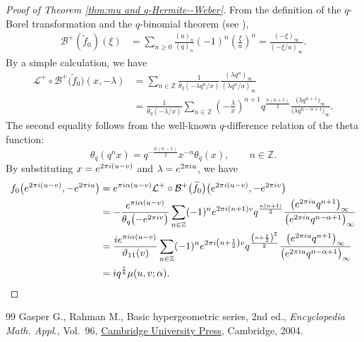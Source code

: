 \documentclass[10pt,a4paper]{article}
\numberwithin{equation}{section}
\theoremstyle{definition}
\newcommand{\Zz}{\mathbb{Z}}
\begin{document}
\begin{proof}[Proof of Theorem \ref{thm:mu and q-Hermite--Weber}]
From the definition of the $q$-Borel transformation and the $q$-binomial theorem (see \cite[p.~8, equation~(1.3.2)]{GR}),
\begin{align*}
\mathcal{B}^{+}\left(\widetilde{f}_{0}\right)(\xi )
 &=
 \sum_{n\geq 0}\frac{(a)_{n}}{(q)_{n}}(-1)^{n}\left(\frac{\xi }{a}\right)^{n}
 =
 \frac{(-\xi )_{\infty }}{(-\xi /a)_{\infty }}.
\end{align*}
By a simple calculation, we have
\begin{align*}
\mathcal{L}^{+}\circ\mathcal{B}^{+}\big(\widetilde{f}_{0}\big)(x,-\lambda)
 &=
 \sum_{n\in\Zz}\frac{1}{\theta_q(-\lambda q^n/x)}\frac{(\lambda q^n)_\infty}{(\lambda q^n/a)_\infty} \\
 &=
 \frac{1}{\theta_q(-\lambda/x)}\sum_{n\in\Zz}\left(-\frac{\lambda}{x}\right)^{n+1}q^\frac{n(n+1)}{2}
 \frac{\big(\lambda q^{n+1}\big)_{\infty }}{\big(\lambda q^{n-\alpha +1}\big)_{\infty }}.
\end{align*}
The second equality follows from the well-known $q$-difference relation of the theta function:
\[
\theta _{q}(q^{n}x)=q^{-\frac{n(n-1)}{2}}x^{-n}\theta _{q}(x), \qquad n \in \mathbb{Z}.
\]
By substituting $x={\rm e}^{2\pi{\rm i}(u-v)}$ and $\lambda={\rm e}^{2\pi{\rm i}u}$, we have
\begin{align*}
f_0\big({\rm e}^{2\pi{\rm i}(u-v)},-{\rm e}^{2\pi{\rm i}u}\big)
 &=
 {\rm e}^{\pi{\rm i}\alpha(u-v)}\mathcal{L}^{+}\circ\mathcal{B}^{+}\big(\widetilde{f}_{0}\big)\big({\rm e}^{2\pi{\rm i}(u-v)},-{\rm e}^{2\pi{\rm i}v}\big) \\
 &=
 -\frac{{\rm e}^{\pi{\rm i}\alpha(u-v)}}{\theta_q\big({-}{\rm e}^{2\pi{\rm i}v}\big)}\sum_{n\in\Zz}(-1)^n{\rm e}^{2\pi{\rm i}(n+1)v}q^\frac{n(n+1)}{2}\frac{\big({\rm e}^{2\pi{\rm i}u}q^{n+1}\big)_\infty}{\big({\rm e}^{2\pi{\rm i}u}q^{n-\alpha+1}\big)_\infty} \\
 &=
 \frac{{\rm i}{\rm e}^{\pi{\rm i}\alpha(u-v)}}{\vartheta_{11}(v)}\sum_{n\in\Zz}(-1)^n{\rm e}^{2\pi{\rm i}\left(n+\frac{1}{2}\right)v}q^\frac{\left(n+\frac{1}{2}\right)^2}{2}\frac{\big({\rm e}^{2\pi{\rm i}u}q^{n+1}\big)_\infty}{\big({\rm e}^{2\pi{\rm i}u}q^{n-\alpha+1}\big)_\infty} \\
 &=
 {\rm i}q^\frac{1}{8}\mu(u,v;\alpha).\tag*{\qed}
\end{align*}\renewcommand{\qed}{}
\end{proof}

\begin{thebibliography}{99}
Gasper G., Rahman M., Basic hypergeometric series, 2nd ed., \textit{Encyclopedia Math.
 Appl.}, Vol.~96, \href{https://doi.org/10.1017/CBO9780511526251}{Cambridge University Press}, Cambridge, 2004.

\end{thebibliography}
\end{document}
